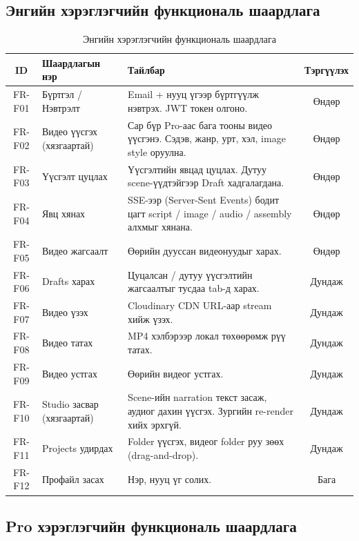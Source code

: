 \subsection{Энгийн хэрэглэгчийн функциональ шаардлага}

\begin{table}[H]
\centering

\label{tab:fr_free}
\small
\begin{tabular}{|c|p{3.2cm}|p{6cm}|c|}
\hline
\textbf{ID} & \textbf{Шаардлагын нэр} & \textbf{Тайлбар} & \textbf{Тэргүүлэх} \\
\hline
FR-F01 & Бүртгэл / Нэвтрэлт & Email + нууц үгээр бүртгүүлж нэвтрэх. JWT токен олгоно. & Өндөр \\
\hline
FR-F02 & Видео үүсгэх (хязгаартай) & Сар бүр Pro-аас бага тооны видео үүсгэнэ. Сэдэв, жанр, урт, хэл, image style оруулна. & Өндөр \\
\hline
FR-F03 & Үүсгэлт цуцлах & Үүсгэлтийн явцад цуцлах. Дутуу scene-үүдтэйгээр Draft хадгалагдана. & Өндөр \\
\hline
FR-F04 & Явц хянах & SSE-ээр (Server-Sent Events) бодит цагт script / image / audio / assembly алхмыг хянана. & Өндөр \\
\hline
FR-F05 & Видео жагсаалт & Өөрийн дууссан видеонуудыг харах. & Өндөр \\
\hline
FR-F06 & Drafts харах & Цуцалсан / дутуу үүсгэлтийн жагсаалтыг тусдаа tab-д харах. & Дундаж \\
\hline
FR-F07 & Видео үзэх & Cloudinary CDN URL-аар stream хийж үзэх. & Дундаж \\
\hline
FR-F08 & Видео татах & MP4 хэлбэрээр локал төхөөрөмж рүү татах. & Дундаж \\
\hline
FR-F09 & Видео устгах & Өөрийн видеог устгах. & Дундаж \\
\hline
FR-F10 & Studio засвар (хязгаартай) & Scene-ийн narration текст засаж, аудиог дахин үүсгэх. Зургийн re-render хийх эрхгүй. & Дундаж \\
\hline
FR-F11 & Projects удирдах & Folder үүсгэх, видеог folder руу зөөх (drag-and-drop). & Дундаж \\
\hline
FR-F12 & Профайл засах & Нэр, нууц үг солих. & Бага \\
\hline
\end{tabular}
\caption{Энгийн хэрэглэгчийн функциональ шаардлага}
\end{table}



\subsection{Pro хэрэглэгчийн функциональ шаардлага}

